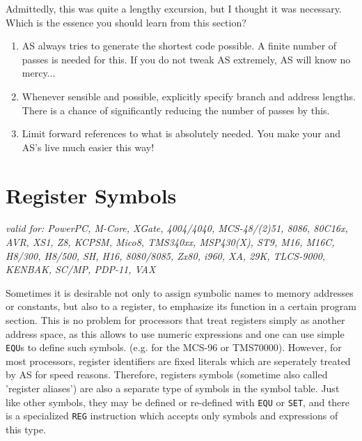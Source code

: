 \documentclass[12pt,twoside]{report}
\makeatletter
\newcommand{\tty}[1]{{\tt #1}}
\newcommand{\ttindex}[1]{\index{#1@{\tt #1}}}
\newcommand{\asname}{{AS}}
\makeatother
\begin{document}
Admittedly, this was quite a lengthy excursion, but I thought it was
necessary.  Which is the essence you should learn from this section?
\begin{enumerate}
\item{\asname{} always tries to generate the shortest code possible.  A
      finite number of passes is needed for this.  If you do not tweak
      \asname{} extremely, \asname{} will know no mercy...}
\item{Whenever sensible and possible, explicitly specify branch and
      address lengths.  There is a chance of significantly reducing the
      number of passes by this.}
\item{Limit forward references to what is absolutely needed.  You make
      your and \asname{}'s live much easier this way!}
\end{enumerate}


\section{Register Symbols}
\label{SectRegSyms} \ttindex{Register Symbols}

{\em valid for: PowerPC, M-Core, XGate, 4004/4040, MCS-48/(2)51, 8086,
     80C16x, AVR, XS1, Z8, KCPSM, Mico8, TMS340xx, MSP430(X), ST9, M16,
     M16C, H8/300, H8/500, SH, H16, 8080/8085, Zx80, i960, XA, 29K,
     TLCS-9000, KENBAK, SC/MP, PDP-11, VAX}

Sometimes it is desirable not only to assign symbolic names to memory
addresses or constants, but also to a register, to emphasize its function
in a certain program section.  This is no problem for processors that
treat registers simply as another address space, as this allows to use
numeric expressions and one can use simple \tty{EQU}s to define such
symbols.  (e.g. for the MCS-96 or TMS70000).  However, for most
processors, register identifiers are fixed literals which are seperately
treated by \asname{} for speed reasons.  Therefore, registers symbols (sometime
also called 'register aliases') are also a separate type of symbols in
the symbol table.  Just like other symbols, they may be defined or re-defined
with \tty{EQU} or \tty{SET}, and there is a specialized \tty{REG} instruction
which accepts only symbols and expressions of this type.
\end{document}
